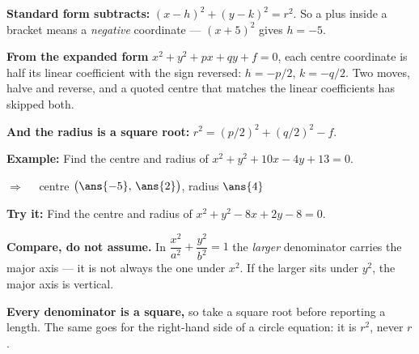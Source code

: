 \documentclass[12pt]{article}
\begin{document}


\begin{formulabox}
\textbf{Standard form subtracts:} $(x-h)^2 + (y-k)^2 = r^2$. So a plus inside a bracket means
a \emph{negative} coordinate --- $(x+5)^2$ gives $h = -5$.\par
\textbf{From the expanded form} $x^2 + y^2 + px + qy + f = 0$, each centre coordinate is half
its linear coefficient with the sign reversed: $h = -p/2$, $k = -q/2$. Two moves, halve and
reverse, and a quoted centre that matches the linear coefficients has skipped both.\par
\textbf{And the radius is a square root:} $r^2 = (p/2)^2 + (q/2)^2 - f$.
\end{formulabox}

\begin{examplebox}
\textbf{Example:} \quad Find the centre and radius of $x^2 + y^2 + 10x - 4y + 13 = 0$.

$\Rightarrow\quad$ centre $\bigl(\ans{-5},\, \ans{2}\bigr)$, \quad radius $\ans{4}$
\end{examplebox}

\begin{tryitbox}
\textbf{Try it:} \quad Find the centre and radius of $x^2 + y^2 - 8x + 2y - 8 = 0$.\\[2pt]
\end{tryitbox}


\begin{formulabox}
\textbf{Compare, do not assume.} In $\dfrac{x^2}{a^2} + \dfrac{y^2}{b^2} = 1$ the \emph{larger}
denominator carries the major axis --- it is not always the one under $x^2$. If the larger sits
under $y^2$, the major axis is vertical.\par
\textbf{Every denominator is a square,} so take a square root before reporting a length. The
same goes for the right-hand side of a circle equation: it is $r^2$, never $r$.
\end{formulabox}
\end{document}

